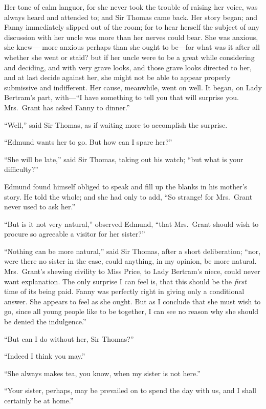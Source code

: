 \documentclass{article}
\begin{document}
Her tone of calm languor, for she never took the trouble
of raising her voice, was always heard and attended to;
and Sir Thomas came back.  Her story began; and Fanny
immediately slipped out of the room; for to hear herself
the subject of any discussion with her uncle was more
than her nerves could bear.  She was anxious, she knew---%
more anxious perhaps than she ought to be---for what was
it after all whether she went or staid? but if her uncle
were to be a great while considering and deciding,
and with very grave looks, and those grave looks directed
to her, and at last decide against her, she might not
be able to appear properly submissive and indifferent.
Her cause, meanwhile, went on well.  It began, on Lady
Bertram's part, with---``I have something to tell you
that will surprise you.  Mrs.\ Grant has asked Fanny
to dinner.''

``Well,'' said Sir Thomas, as if waiting more to accomplish
the surprise.

``Edmund wants her to go.  But how can I spare her?''

``She will be late,'' said Sir Thomas, taking out his watch;
``but what is your difficulty?''

Edmund found himself obliged to speak and fill up
the blanks in his mother's story.  He told the whole;
and she had only to add, ``So strange! for Mrs.\ Grant
never used to ask her.''

``But is it not very natural,'' observed Edmund,
``that Mrs.\ Grant should wish to procure so agreeable
a visitor for her sister?''

``Nothing can be more natural,'' said Sir Thomas, after a
short deliberation; ``nor, were there no sister in the case,
could anything, in my opinion, be more natural.
Mrs.\ Grant's shewing civility to Miss Price, to Lady
Bertram's niece, could never want explanation.  The only
surprise I can feel is, that this should be the \emph{first}
time of its being paid.  Fanny was perfectly right in
giving only a conditional answer.  She appears to feel
as she ought.  But as I conclude that she must wish to go,
since all young people like to be together, I can see
no reason why she should be denied the indulgence.''

``But can I do without her, Sir Thomas?''

``Indeed I think you may.''

``She always makes tea, you know, when my sister is not here.''

``Your sister, perhaps, may be prevailed on to spend
the day with us, and I shall certainly be at home.''
\end{document}

